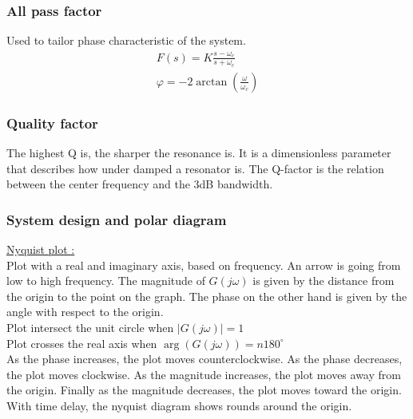 \documentclass[../main.tex]{subfiles}
\begin{document}
\subsubsection{All pass factor}
Used to tailor phase characteristic of the system.\\
\begin{equation}
    \begin{gathered}
        F(s) = K \frac{s-\omega_c}{s+\omega_c}\\
        \varphi = -2 \arctan(\frac{\omega}{\omega_c})
    \end{gathered}
\end{equation}

\subsubsection{Quality factor}
The highest Q is, the sharper the resonance is. It is a dimensionless parameter that describes how under damped a resonator is. The Q-factor is the relation between the center frequency and the 3dB bandwidth.\\

\subsubsection{System design and polar diagram}
\quad \underline{Nyquist plot :}\\
Plot with a real and imaginary axis, based on frequency. An arrow is going from low to high frequency. The magnitude of $G(j\omega)$ is given by the distance from the origin to the point on the graph. The phase on the other hand is given by the angle with respect to the origin. \\
Plot intersect the unit circle when $\lvert G(j\omega)\rvert = 1$\\
Plot crosses the real axis when $\arg(G(j\omega)) = n 180^\circ$\\

As the phase increases, the plot moves counterclockwise. As the phase decreases, the plot moves clockwise. As the magnitude increases, the plot moves away from the origin. Finally as the magnitude decreases, the plot moves toward the origin.\\
With time delay, the nyquist diagram shows rounds around the origin.\\
\end{document}
